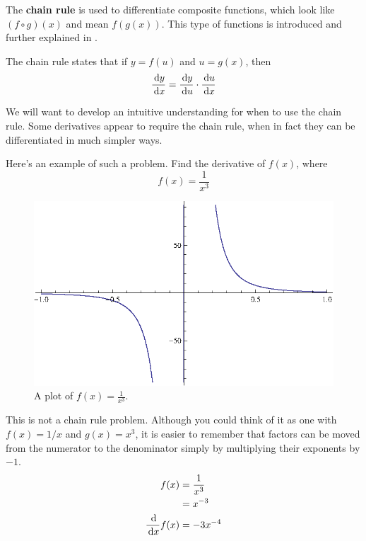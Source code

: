 The \textbf{chain rule} is used to differentiate composite functions, which look like $(f \circ g)(x)$ and mean $f(g(x))$.
This type of functions is introduced and further explained in .
\begin{theorem}
  The chain rule states that if $y=f(u)$ and $u=g(x)$, then
  \begin{equation}
    \frac{\,\mathrm{d} y}{\,\mathrm{d} x}=\frac{\,\mathrm{d} y}{\,\mathrm{d} u} \cdot \frac{\,\mathrm{d} u}{\,\mathrm{d} x}
  \end{equation}
\end{theorem}
We will want to develop an intuitive understanding for when to use the chain rule.
Some derivatives appear to require the chain rule, when in fact they can be differentiated in much simpler ways.
\begin{ex}
  Here's an example of such a problem.
  Find the derivative of $f(x)$, where
  \[ f(x)=\frac{1}{x^3} \]
  \begin{figure}[h]
    \begin{center}
      \includegraphics{continuous/derivatives/chainrule_1.eps}
    \end{center}
    \caption{A plot of $f(x)=\frac{1}{x^3}$.}
  \end{figure}
  \begin{sol}
    This is not a chain rule problem. Although you could think of it as one with $f(x)=1/x$ and $g(x)=x^3$, it is easier to remember that factors can be moved from the numerator to the denominator simply by multiplying their exponents by $-1$.
    \begin{align*}
      f(x)&=\frac{1}{x^3}\\&=x^{-3} \\
      \frac{\,\mathrm{d}}{\,\mathrm{d} x} f(x)&=-3x^{-4}
    \end{align*}
  \end{sol}
\end{ex}
